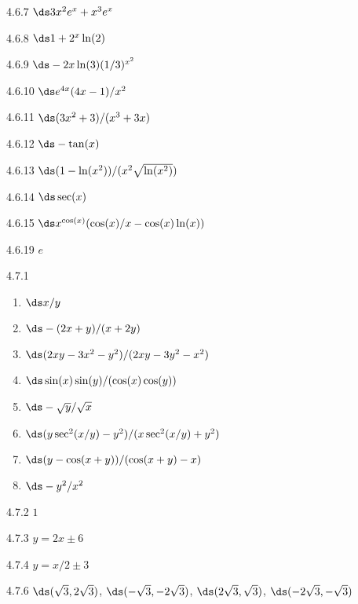 \begin{Answer}{4.6.7}
	$\ds 3x^2e^x+x^3e^x$
\end{Answer}
\begin{Answer}{4.6.8}
	$\ds 1+2^x\ln(2)$
\end{Answer}
\begin{Answer}{4.6.9}
	$\ds -2x\ln(3)(1/3)^{x^2}$
\end{Answer}
\begin{Answer}{4.6.10}
	$\ds e^{4x}(4x-1)/x^2$
\end{Answer}
\begin{Answer}{4.6.11}
	$\ds (3x^2+3)/(x^3+3x)$
\end{Answer}
\begin{Answer}{4.6.12}
	$\ds -\tan(x)$
\end{Answer}
\begin{Answer}{4.6.13}
	$\ds (1-\ln(x^2))/(x^2\sqrt{\ln(x^2)})$
\end{Answer}
\begin{Answer}{4.6.14}
	$\ds \sec(x)$
\end{Answer}
\begin{Answer}{4.6.15}
	$\ds x^{\cos(x)}(\cos(x)/x-\cos(x)\ln(x))$
\end{Answer}
\begin{Answer}{4.6.19}
$e$
\end{Answer}
\begin{Answer}{4.7.1}
\begin{enumerate}
	\item	$\ds x/y$
	\item	$\ds -(2x+y)/(x+2y)$
	\item	$\ds (2xy-3x^2-y^2)/(2xy-3y^2-x^2)$
	\item	$\ds \sin(x)\sin(y)/(\cos(x)\cos(y))$
	\item	$\ds-\sqrt{y}/\sqrt{x}$
	\item	$\ds (y\sec^2(x/y)-y^2)/(x\sec^2(x/y)+y^2)$
	\item	$\ds (y-\cos(x+y))/(\cos(x+y)-x)$
	\item	$\ds -y^2/x^2$
\end{enumerate}
\end{Answer}
\begin{Answer}{4.7.2}
	$1$
\end{Answer}
\begin{Answer}{4.7.3}
	$y=2x\pm6$
\end{Answer}
\begin{Answer}{4.7.4}
	$y=x/2\pm3$
\end{Answer}
\begin{Answer}{4.7.6}
	$\ds (\sqrt3,2\sqrt3)$, $\ds (-\sqrt3,-2\sqrt3)$, $\ds (2\sqrt3,\sqrt3)$,
$\ds (-2\sqrt3,-\sqrt3)$
\end{Answer}
